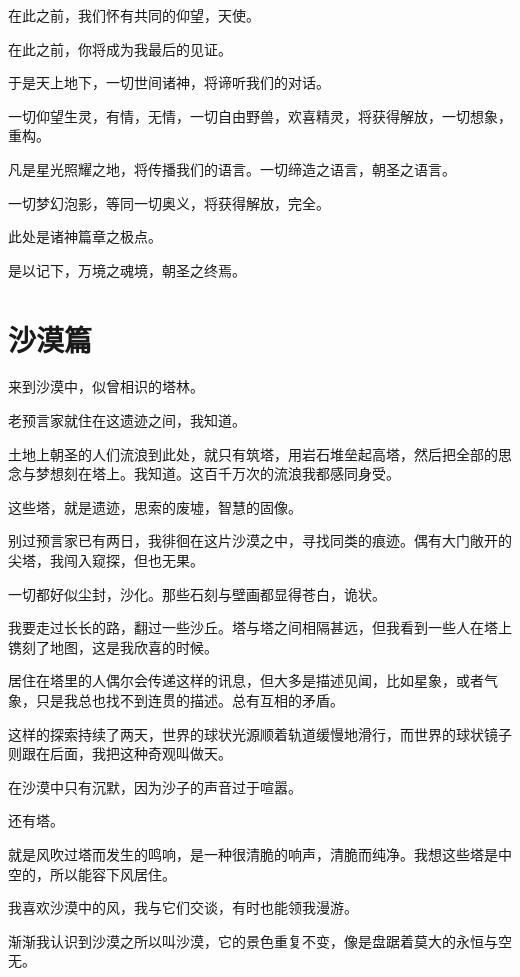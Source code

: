 \documentclass[UTF8]{article}
\begin{document}
\par 在此之前，我们怀有共同的仰望，天使。
\par 在此之前，你将成为我最后的见证。
\\[0.6cm]
\par 于是天上地下，一切世间诸神，将谛听我们的对话。
\par 一切仰望生灵，有情，无情，一切自由野兽，欢喜精灵，将获得解放，一切想象，重构。
\par 凡是星光照耀之地，将传播我们的语言。一切缔造之语言，朝圣之语言。
\par 一切梦幻泡影，等同一切奥义，将获得解放，完全。
\\[0.6cm]
\par 此处是诸神篇章之极点。
\par 是以记下，万境之魂境，朝圣之终焉。
\section{沙漠篇}
\par 来到沙漠中，似曾相识的塔林。
\par 老预言家就住在这遗迹之间，我知道。
\par 土地上朝圣的人们流浪到此处，就只有筑塔，用岩石堆垒起高塔，然后把全部的思念与梦想刻在塔上。我知道。这百千万次的流浪我都感同身受。
\par 这些塔，就是遗迹，思索的废墟，智慧的固像。
\par 别过预言家已有两日，我徘徊在这片沙漠之中，寻找同类的痕迹。偶有大门敞开的尖塔，我闯入窥探，但也无果。
\par 一切都好似尘封，沙化。那些石刻与壁画都显得苍白，诡状。
\par 我要走过长长的路，翻过一些沙丘。塔与塔之间相隔甚远，但我看到一些人在塔上镌刻了地图，这是我欣喜的时候。
\par 居住在塔里的人偶尔会传递这样的讯息，但大多是描述见闻，比如星象，或者气象，只是我总也找不到连贯的描述。总有互相的矛盾。
\par 这样的探索持续了两天，世界的球状光源顺着轨道缓慢地滑行，而世界的球状镜子则跟在后面，我把这种奇观叫做天。
\\[0.6cm]
\par 在沙漠中只有沉默，因为沙子的声音过于喧嚣。
\par 还有塔。
\par 就是风吹过塔而发生的鸣响，是一种很清脆的响声，清脆而纯净。我想这些塔是中空的，所以能容下风居住。
\par 我喜欢沙漠中的风，我与它们交谈，有时也能领我漫游。
\par 渐渐我认识到沙漠之所以叫沙漠，它的景色重复不变，像是盘踞着莫大的永恒与空无。
\end{document}
